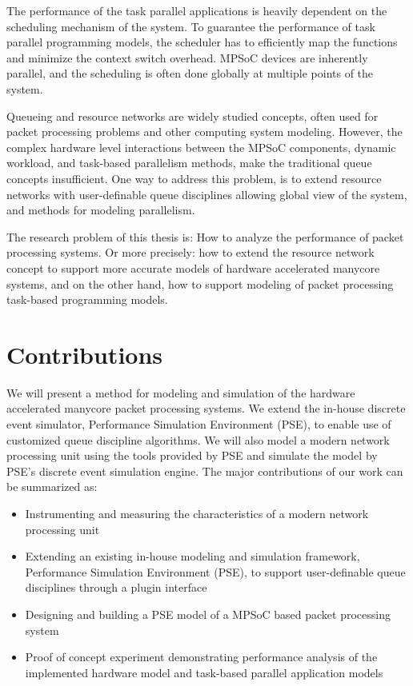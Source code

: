 The performance of the task parallel applications is heavily dependent on the scheduling mechanism of the system. To guarantee the performance of task parallel programming models, the scheduler has to efficiently map the functions and minimize the context switch overhead. MPSoC devices are inherently parallel, and the scheduling is often done globally at multiple points of the system.

Queueing and resource networks are widely studied concepts, often used for packet processing problems and other computing system modeling. However, the complex hardware level interactions between the MPSoC components, dynamic workload, and task-based parallelism methods, make the traditional queue concepts insufficient. One way to address this problem, is to extend resource networks with user-definable queue disciplines allowing global view of the system, and methods for modeling parallelism.

The research problem of this thesis is: How to analyze the performance of packet processing systems. Or more precisely: how to extend the resource network concept to support more accurate models of hardware accelerated manycore systems, and on the other hand, how to support modeling of packet processing task-based programming models.

\section{Contributions}
We will present a method for modeling and simulation of the hardware accelerated manycore packet processing systems. We extend the in-house discrete event simulator, Performance Simulation Environment (PSE), to enable use of customized queue discipline algorithms. We will also model a modern network processing unit using the tools provided by PSE and simulate the model by PSE's discrete event simulation engine. The major contributions of our work can be summarized as:

\begin{itemize}

\item Instrumenting and measuring the characteristics of a modern network processing unit

\item Extending an existing in-house modeling and simulation framework, Performance Simulation Environment (PSE), to support user-definable queue disciplines through a plugin interface

\item Designing and building a PSE model of a MPSoC based packet processing system

\item Proof of concept experiment demonstrating performance analysis of the implemented hardware model and task-based parallel application models

\end{itemize}

